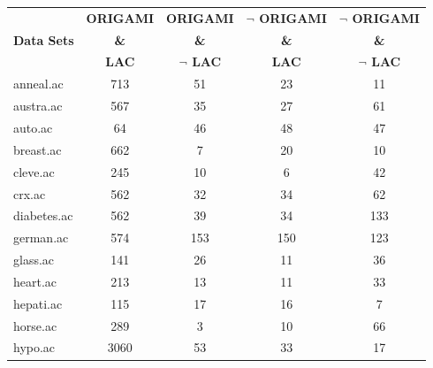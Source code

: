 \begin{table}[htbp]
	\centering
		\begin{tabular}{|l|c|c|c|c|}
		\hline
				& \textbf{ORIGAMI}	& \textbf{ORIGAMI}		& \textbf{$\neg$ ORIGAMI}	& \textbf{$\neg$ ORIGAMI}	\\
		\textbf{Data Sets}	& \textbf{\&}		& \textbf{\&}			& \textbf{\&}			& \textbf{\&}			\\
				&  \textbf{LAC}		& \textbf{$\neg$ LAC}		& \textbf{LAC}			& \textbf{$\neg$ LAC}		\\
		\hline
		anneal.ac       & 713           & 51                 & 23                       & 11                            \\
		\hline
		austra.ac       & 567           & 35                 & 27                       & 61                            \\
		\hline
		auto.ac         & 64            & 46                 & 48                       & 47                            \\
		\hline
		breast.ac       & 662           & 7                  & 20                       & 10                            \\
		\hline
		cleve.ac        & 245           & 10                 & 6                        & 42                            \\
		\hline
		crx.ac          & 562           & 32                 & 34                       & 62                            \\
		\hline
		diabetes.ac     & 562           & 39                 & 34                       & 133                           \\
		\hline
		german.ac       & 574           & 153                & 150                      & 123                           \\
		\hline
		glass.ac        & 141           & 26                 & 11                       & 36                            \\
		\hline
		heart.ac        & 213           & 13                 & 11                       & 33                            \\
		\hline
		hepati.ac       & 115           & 17                 & 16                       & 7                             \\
		\hline
		horse.ac        & 289           & 3                  & 10                       & 66                            \\
		\hline
		hypo.ac         & 3060          & 53                 & 33                       & 17                            \\

\end{tabular}
\end{table}

